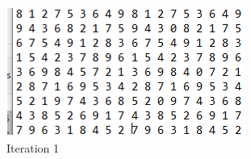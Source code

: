 \documentclass{article}
\begin{document}
    \begin{figure}[!htb]
      \includegraphics[width=\linewidth]{iteration1.png}
      \caption{Iteration 1}\label{fig:awesome_image1}
    \endminipage\hfill
      \includegraphics[width=\linewidth]{iteration2.png}

\end{figure}
\end{document}
